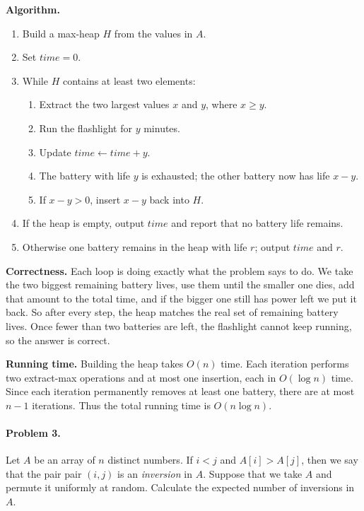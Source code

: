 \documentclass[10pt]{article}
\begin{document}
\textbf{Algorithm.}
\begin{enumerate}
\item Build a max-heap $H$ from the values in $A$.
\item Set $\textit{time}=0$.
\item While $H$ contains at least two elements:
\begin{enumerate}[label=\alph*)]
\item Extract the two largest values $x$ and $y$, where $x\ge y$.
\item Run the flashlight for $y$ minutes.
\item Update $\textit{time}\leftarrow \textit{time}+y$.
\item The battery with life $y$ is exhausted; the other battery now has life $x-y$.
\item If $x-y>0$, insert $x-y$ back into $H$.
\end{enumerate}
\item If the heap is empty, output $\textit{time}$ and report that no battery life remains.
\item Otherwise one battery remains in the heap with life $r$; output $\textit{time}$ and $r$.
\end{enumerate}

\textbf{Correctness.} Each loop is doing exactly what the problem says to do.  We take the two biggest remaining battery lives, use them until the smaller one dies, add that amount to the total time, and if the bigger one still has power left we put it back.  So after every step, the heap matches the real set of remaining battery lives.  Once fewer than two batteries are left, the flashlight cannot keep running, so the answer is correct.

\textbf{Running time.} Building the heap takes $O(n)$ time.  Each iteration performs two extract-max operations and at most one insertion, each in $O(\log n)$ time.  Since each iteration permanently removes at least one battery, there are at most $n-1$ iterations.  Thus the total running time is $O(n\log n)$.

\paragraph{Problem 3.} Let $A$ be an array of $n$ distinct numbers. If $i < j$ and $A[i]  > A[j]$, then we say that the pair 
pair $(i,j)$ is an \emph{inversion} in $A$.  Suppose that we take $A$ and permute it uniformly at random. Calculate the expected number of inversions in $A$.
\end{document}
